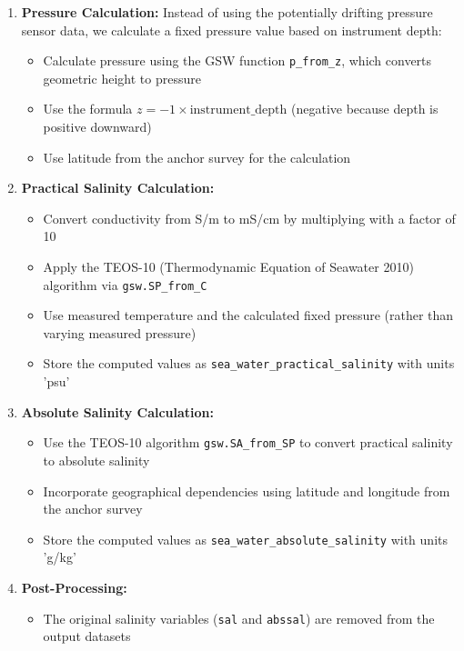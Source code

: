 \documentclass[11pt]{article}
\begin{document}
\begin{enumerate}
    \item \textbf{Pressure Calculation:} Instead of using the potentially drifting pressure sensor data, we calculate a fixed pressure value based on instrument depth:
    \begin{itemize}
        \item Calculate pressure using the GSW function \texttt{p\_from\_z}, which converts geometric height to pressure
        \item Use the formula $z = -1 \times \text{instrument\_depth}$ (negative because depth is positive downward)
        \item Use latitude from the anchor survey for the calculation
    \end{itemize}
    
    \item \textbf{Practical Salinity Calculation:}
    \begin{itemize}
        \item Convert conductivity from S/m to mS/cm by multiplying with a factor of 10
        \item Apply the TEOS-10 (Thermodynamic Equation of Seawater 2010) algorithm via \texttt{gsw.SP\_from\_C}
        \item Use measured temperature and the calculated fixed pressure (rather than varying measured pressure)
        \item Store the computed values as \texttt{sea\_water\_practical\_salinity} with units 'psu'
    \end{itemize}
    
    \item \textbf{Absolute Salinity Calculation:}
    \begin{itemize}
        \item Use the TEOS-10 algorithm \texttt{gsw.SA\_from\_SP} to convert practical salinity to absolute salinity
        \item Incorporate geographical dependencies using latitude and longitude from the anchor survey
        \item Store the computed values as \texttt{sea\_water\_absolute\_salinity} with units 'g/kg'
    \end{itemize}
    
    \item \textbf{Post-Processing:}
    \begin{itemize}
        \item The original salinity variables (\texttt{sal} and \texttt{abssal}) are removed from the output datasets
    \end{itemize}
\end{enumerate}
\end{document}
